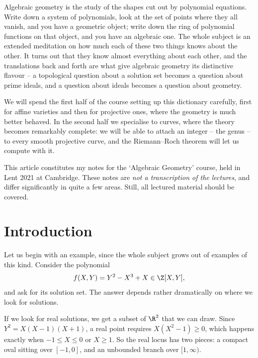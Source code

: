 



Algebraic geometry is the study of the shapes cut out by polynomial equations. Write down a system of polynomials, look at the set of points where they all vanish, and you have a geometric object; write down the ring of polynomial functions on that object, and you have an algebraic one. The whole subject is an extended meditation on how much each of these two things knows about the other. It turns out that they know almost everything about each other, and the translations back and forth are what give algebraic geometry its distinctive flavour -- a topological question about a solution set becomes a question about prime ideals, and a question about ideals becomes a question about geometry.

We will spend the first half of the course setting up this dictionary carefully, first for affine varieties and then for projective ones, where the geometry is much better behaved. In the second half we specialise to curves, where the theory becomes remarkably complete: we will be able to attach an integer -- the genus -- to every smooth projective curve, and the Riemann--Roch theorem will let us compute with it.

This article constitutes my notes for the `Algebraic Geometry' course, held in Lent 2021 at Cambridge. These notes are \emph{not a transcription of the lectures}, and differ significantly in quite a few areas. Still, all lectured material should be covered.



\section{Introduction}

Let us begin with an example, since the whole subject grows out of examples of this kind. Consider the polynomial
$$f(X,Y) = Y^2 - X^3 + X \in \Z[X,Y],$$
and ask for its solution set. The answer depends rather dramatically on where we look for solutions.

If we look for real solutions, we get a subset of $\R^2$ that we can draw. Since $Y^2 = X(X-1)(X+1)$, a real point requires $X(X^2-1) \geq 0$, which happens exactly when $-1 \leq X \leq 0$ or $X \geq 1$. So the real locus has two pieces: a compact oval sitting over $[-1,0]$, and an unbounded branch over $[1,\infty)$.

